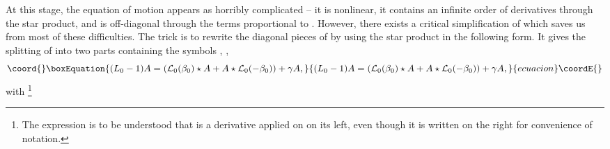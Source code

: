\documentclass[a4paper,aps,preprint,nofootinbib,eqsecnum]{revtex4}
\begin{document}
At this stage, the equation of motion appears as horribly
complicated -- it is nonlinear, it contains an infinite order of
derivatives through the star product, and is off-diagonal through
the terms proportional to \coordHE{}. However, there
exists a critical simplification of \coordHE{} which saves us from
most of these difficulties. The trick is to rewrite the diagonal
pieces of \coordHE{} by using the star product in the following form.
It gives the splitting of \coordHE{} into two parts containing the symbols \coordHE{},\myHighlight{$\gamma $}\coordHE{} \cite{BM2,BKM1,PREP},
\begin{equation}\coord{}\boxEquation{
(L_{0}-1)A=\left( \mathcal{L}_{0}(\beta _{0})\star A+A\star \mathcal{L}
_{0}(-\beta _{0})\right) +\gamma A,
}{
(L_{0}-1)A=\left( \mathcal{L}_{0}(\beta _{0})\star A+A\star \mathcal{L}
_{0}(-\beta _{0})\right) +\gamma A,
}{ecuacion}\coordE{}\end{equation}%
with \footnote{%
The expression \coordHE{} is to be understood
that \coordHE{} is a derivative applied on \coordHE{} on its left, even
though it is written on the right for convenience of notation.}
\end{document}

